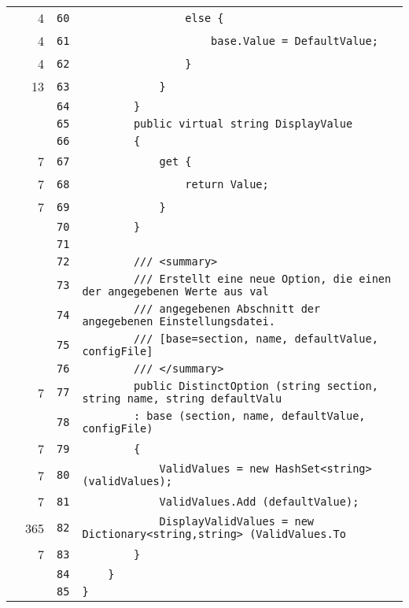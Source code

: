 \documentclass[a4paper,10pt]{article}
\begin{document}
\begin{longtable}[l]{lrrl}
\cellcolor{green} & 4 & \verb~60~ & \verb~                else {~\\
\cellcolor{green} & 4 & \verb~61~ & \verb~                    base.Value = DefaultValue;~\\
\cellcolor{green} & 4 & \verb~62~ & \verb~                }~\\
\cellcolor{green} & 13 & \verb~63~ & \verb~            }~\\
\cellcolor{gray} &  & \verb~64~ & \verb~        }~\\
\cellcolor{gray} &  & \verb~65~ & \verb~        public virtual string DisplayValue~\\
\cellcolor{gray} &  & \verb~66~ & \verb~        {~\\
\cellcolor{green} & 7 & \verb~67~ & \verb~            get {~\\
\cellcolor{green} & 7 & \verb~68~ & \verb~                return Value;~\\
\cellcolor{green} & 7 & \verb~69~ & \verb~            }~\\
\cellcolor{gray} &  & \verb~70~ & \verb~        }~\\
\cellcolor{gray} &  & \verb~71~ & \verb~~\\
\cellcolor{gray} &  & \verb~72~ & \verb~        /// <summary>~\\
\cellcolor{gray} &  & \verb~73~ & \verb~        /// Erstellt eine neue Option, die einen der angegebenen Werte aus val~\\
\cellcolor{gray} &  & \verb~74~ & \verb~        /// angegebenen Abschnitt der angegebenen Einstellungsdatei.~\\
\cellcolor{gray} &  & \verb~75~ & \verb~        /// [base=section, name, defaultValue, configFile]~\\
\cellcolor{gray} &  & \verb~76~ & \verb~        /// </summary>~\\
\cellcolor{green} & 7 & \verb~77~ & \verb~        public DistinctOption (string section, string name, string defaultValu~\\
\cellcolor{gray} &  & \verb~78~ & \verb~        : base (section, name, defaultValue, configFile)~\\
\cellcolor{green} & 7 & \verb~79~ & \verb~        {~\\
\cellcolor{green} & 7 & \verb~80~ & \verb~            ValidValues = new HashSet<string> (validValues);~\\
\cellcolor{green} & 7 & \verb~81~ & \verb~            ValidValues.Add (defaultValue);~\\
\cellcolor{green} & 365 & \verb~82~ & \verb~            DisplayValidValues = new Dictionary<string,string> (ValidValues.To~\\
\cellcolor{green} & 7 & \verb~83~ & \verb~        }~\\
\cellcolor{gray} &  & \verb~84~ & \verb~    }~\\
\cellcolor{gray} &  & \verb~85~ & \verb~}~\\
\end{longtable}
\newpage
\end{document}
